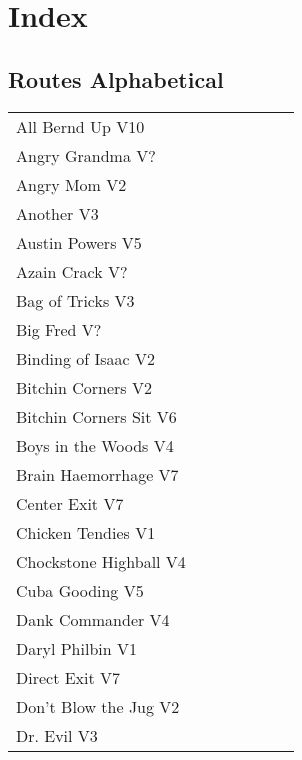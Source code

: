 \chapter{Index}
\lhead{\textcolor{\chapterColor}{\rule[-2pt]{\textwidth}{15pt}}}
\section{Routes Alphabetical}
\begin{center}
\begin{supertabular}{p{0.65\linewidth}r}
All Bernd Up V10 & \pageref{rt:All Bernd Up} \\
Angry Grandma V? & \pageref{rt:Angry Grandma} \\
Angry Mom V2 & \pageref{rt:Angry Mom} \\
Another V3 & \pageref{rt:Another} \\
Austin Powers V5 & \pageref{rt:Austin Powers} \\
Azain Crack V? & \pageref{rt:Azain Crack} \\
Bag of Tricks V3 & \pageref{vr:Bag of Tricks} \\
Big Fred V? & \pageref{rt:Big Fred} \\
Binding of Isaac V2 & \pageref{rt:Binding of Isaac} \\
Bitchin Corners V2 & \pageref{rt:Bitchin Corners} \\
Bitchin Corners Sit V6 & \pageref{vr:Bitchin Corners Sit} \\
Boys in the Woods V4 & \pageref{rt:Boys in the Woods} \\
Brain Haemorrhage V7 & \pageref{vr:Brain Haemorrhage} \\
Center Exit V7 & \pageref{vr:Center Exit} \\
Chicken Tendies V1 & \pageref{rt:Chicken Tendies} \\
Chockstone Highball V4 & \pageref{rt:Chockstone Highball} \\
Cuba Gooding V5 & \pageref{rt:Cuba Gooding} \\
Dank Commander V4 & \pageref{rt:Dank Commander} \\
Daryl Philbin V1 & \pageref{rt:Daryl Philbin} \\
Direct Exit V7 & \pageref{vr:Direct Exit} \\
Don't Blow the Jug V2 & \pageref{rt:Don't Blow the Jug} \\
Dr. Evil V3 & \pageref{rt:Dr. Evil} \\

\end{supertabular}
\end{center}
